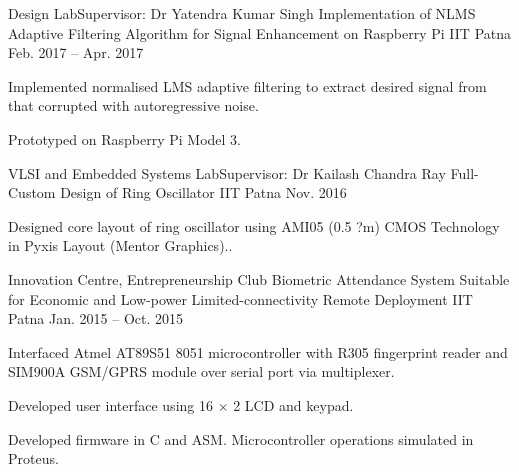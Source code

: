 
\begin{cventries}

\cventry
	{Design Lab\quad\textbar\quad Supervisor: Dr Yatendra Kumar Singh}
	{Implementation of NLMS Adaptive Filtering Algorithm for Signal Enhancement on Raspberry Pi}
	{IIT Patna}
	{Feb. 2017 -- Apr. 2017} %
	{\begin{cvitems} %
		\item {Implemented normalised LMS adaptive filtering to extract desired signal from that corrupted with autoregressive noise.}
		\item {Prototyped on Raspberry Pi Model 3.}
	\end{cvitems}}

\cventry
	{VLSI and Embedded Systems Lab\quad\textbar\quad Supervisor: Dr Kailash Chandra Ray}
	{Full-Custom Design of Ring Oscillator}
	{IIT Patna}
	{Nov. 2016} %
	{\begin{cvitems} %
		\item {Designed core layout of ring oscillator using AMI05 (0.5 ?m) CMOS Technology in Pyxis Layout (Mentor Graphics)..}
	\end{cvitems}}

\cventry
	{Innovation Centre, Entrepreneurship Club}
	{Biometric Attendance System Suitable for Economic and Low-power Limited-connectivity Remote Deployment}
	{IIT Patna}
	{Jan. 2015 -- Oct. 2015} %
	{\begin{cvitems} %
		\item {Interfaced Atmel AT89S51 8051 microcontroller with R305 fingerprint reader and SIM900A GSM/GPRS module over serial port via multiplexer.}
		\item {Developed user interface using 16 $\times$ 2 LCD and keypad.}
		\item {Developed firmware in C and ASM. Microcontroller operations simulated in Proteus.}
	\end{cvitems}}

\end{cventries}
